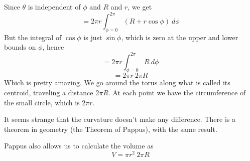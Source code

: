 \documentclass[11pt, oneside]{article}   	%
\begin{document}
Since $\theta$ is independent of $\phi$ and $R$ and $r$, we get
\[ = 2 \pi r  \int_{\phi = 0}^{2 \pi} (R + r \cos \phi) \ d \phi  \]
But the integral of $\cos \phi$ is just $\sin \phi$, which is zero at the upper and lower bounds on $\phi$, hence 
\[ = 2 \pi r  \int_{\phi = 0}^{2 \pi} R \ d \phi  \]
\[ = 2 \pi r  \ 2 \pi R \]
Which is pretty amazing.  We go around the torus along what is called its centroid, traveling a distance $ 2 \pi R$.  At each point we have the circumference of the small circle, which is $ 2 \pi r$.  

It seems strange that the curvature doesn't make any difference.  There is a theorem in geometry (the Theorem of Pappus), with the same result.  

Pappus also allows us to calculate the volume as
\[ V = \pi r^2 \ 2 \pi R \]
\end{document}

